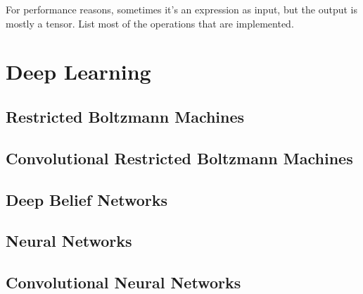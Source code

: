 \documentclass{article}
\begin{document}
For performance reasons, sometimes it's an expression as input, but the output
is mostly a tensor. List most of the operations that are implemented.

\section{Deep Learning}

\subsection{Restricted Boltzmann Machines}

\subsection{Convolutional Restricted Boltzmann Machines}

\subsection{Deep Belief Networks}

\subsection{Neural Networks}

\subsection{Convolutional Neural Networks}
\end{document}
